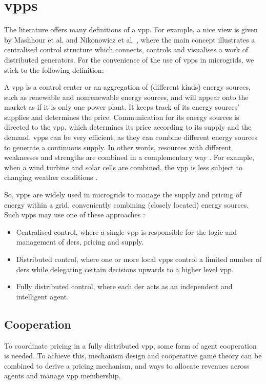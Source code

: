 \section{\aclp{vpp}}
The literature offers many definitions of a \ac{vpp}. For example, a nice view is given by Mashhour et al. \cite{MashhourMoghaddas-Tafreshi2011} and Nikonowicz et al. \cite{NikonowiczMilewski2012}, where the main concept illustrates a centralised control structure which connects, controls and visualises a work of distributed generators. For the convenience of the use of \acp{vpp} in microgrids, we stick to the following definition:

A \ac{vpp} is a control center or an aggregation of (different kinds) energy sources, such as renewable and nonrenewable energy sources, and will appear onto the market as if it is only one power plant. It keeps track of its energy sources' supplies and determines the price. Communication for its energy sources is directed to the \ac{vpp}, which determines its price according to its supply and the demand. \acp{vpp} can be very efficient, as they can combine different energy sources to generate a continuous supply. In other words, resources with different weaknesses and strengths are combined in a complementary way \cite{Koeppel2003}. For example, when a wind turbine and solar cells are combined, the \ac{vpp} is less subject to changing weather conditions \cite{Tromly2001, Kumagai2012, MashhourMoghaddas-Tafreshi2011, NikonowiczMilewski2012}. 

So, \acp{vpp} are widely used in microgrids to manage the supply and pricing of energy within a grid, conveniently combining (closely located) energy sources. Such \acp{vpp} may use one of these approaches \cite{NikonowiczMilewski2012}:
\begin{itemize}
	\item Centralised control, where a single \ac{vpp} is responsible for the logic and management of \acp{der}, pricing and supply.
	\item Distributed control, where one or more local \acp{vpp} control a limited number of \acp{der} while delegating certain decisions upwards to a higher level \ac{vpp}.
	\item Fully distributed control, where each \ac{der} acts as an independent and intelligent agent.
\end{itemize}

\subsection{Cooperation}
\label{microgrids:cooperation}
To coordinate pricing in a fully distributed \ac{vpp}, some form of agent cooperation is needed. To achieve this, mechanism design and cooperative game theory can be combined to derive a pricing mechanism, and ways to allocate revenues across agents and manage \ac{vpp} membership\cite{ChalkiadakisRobuKotaEtAl2011}. 

